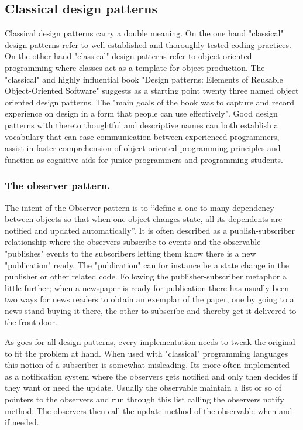 \documentclass[english]{ifimaster}
\begin{document}
\subsection{Classical design patterns}
Classical design patterns carry a double meaning. On the one hand "classical" design patterns refer to well established and thoroughly tested coding practices\parencite[p. 12]{gamma}. On the other hand "classical" design patterns refer to object-oriented programming where classes act as a template for object production\parencite[p. 115]{stefanov}. The "classical" and highly influential book "Design patterns: Elements of Reusable Object-Oriented Software" suggests as a starting point twenty three named object oriented design patterns. The "main goals of the book was to capture and record experience on design in a form that people can use effectively"\parencite[p. 12]{gamma}. Good design patterns with thereto thoughtful and descriptive names can both establish a vocabulary that can ease communication between experienced programmers, assist in faster comprehension of object oriented programming principles and function as cognitive aids for junior programmers and programming students.

\subsubsection{The observer pattern.}
The intent of the Observer pattern is to “define a one-to-many dependency between objects so that when one object changes state, all its dependents are notified and updated automatically”\parencite[p. 9]{gamma}. It is often described as a publish-subscriber relationship where the observers subscribe to events and the observable "publishes" events to the subscribers letting them know there is a new "publication" ready. The "publication" can for instance be a state change in the publisher or other related code. Following the publisher-subscriber metaphor a little further; when a newspaper is ready for publication there has usually been two ways for news readers to obtain an exemplar of the paper, one by going to a news stand buying it there, the other to subscribe and thereby get it delivered to the front door\parencite[p. 171-174]{stefanov}.

As goes for all design patterns, every implementation needs to tweak the original to fit the problem at hand. When used with "classical" programming languages this notion of a subscriber is somewhat misleading. Its more often implemented as a notification system where the observers gets notified and only then decides if they want or need the update. Usually the observable maintain a list or so of pointers to the observers and run through this list calling the observers notify method. The observers then call the update method of the observable when and if needed.
\end{document}
